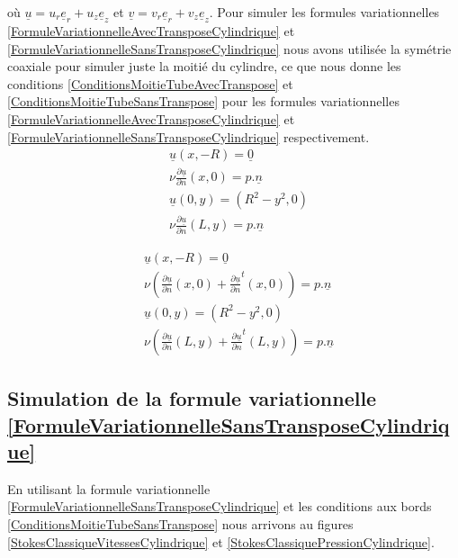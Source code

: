 \documentclass[11pt,a4paper]{article}
\numberwithin{equation}{subsection}
\numberwithin{figure}{subsection}
\begin{document}
où $\underline{u} = u_r\underline{e}_r + u_z\underline{e}_z$ et $\underline{v} = v_r\underline{e}_r + v_z\underline{e}_z$. Pour simuler les formules variationnelles \ref{FormuleVariationnelleAvecTransposeCylindrique} et \ref{FormuleVariationnelleSansTransposeCylindrique} nous avons utilisée la symétrie coaxiale pour simuler juste la moitié du cylindre, ce que nous donne les conditions \ref{ConditionsMoitieTubeAvecTranspose} et \ref{ConditionsMoitieTubeSansTranspose} pour les formules variationnelles \ref{FormuleVariationnelleAvecTransposeCylindrique} et \ref{FormuleVariationnelleSansTransposeCylindrique} respectivement.
\begin{equation}
\begin{aligned}
& \underline{u}(x,-R) = \underline{0} \\
& \nu\frac{\partial\underline{u}}{\partial n}(x,0) = p.\underline{n} \\
& \underline{u}(0,y) = \left(R^2 - y^2, 0\right) \\
& \nu\frac{\partial\underline{u}}{\partial n}(L,y) = p.\underline{n}
\end{aligned} \label{ConditionsMoitieTubeSansTranspose}
\end{equation}

\begin{equation}
\begin{aligned}
& \underline{u}(x,-R) = \underline{0} \\
& \nu\left(\frac{\partial\underline{u}}{\partial n}(x,0) + \frac{\partial\underline{u}}{\partial n}^t(x,0)\right) = p.\underline{n} \\
& \underline{u}(0,y) = \left(R^2 - y^2, 0\right) \\
& \nu\left(\frac{\partial\underline{u}}{\partial n}(L,y) + \frac{\partial\underline{u}}{\partial n}^t(L,y)\right) = p.\underline{n}
\end{aligned} \label{ConditionsMoitieTubeAvecTranspose}
\end{equation}

\subsection{Simulation de la formule variationnelle \ref{FormuleVariationnelleSansTransposeCylindrique}}

En utilisant la formule variationnelle \ref{FormuleVariationnelleSansTransposeCylindrique} et les conditions aux bords \ref{ConditionsMoitieTubeSansTranspose} nous arrivons au figures \ref{StokesClassiqueVitessesCylindrique} et \ref{StokesClassiquePressionCylindrique}.
\end{document}
